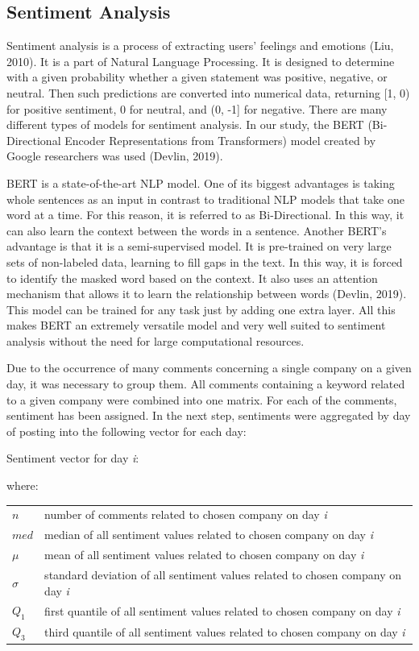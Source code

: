 \documentclass[review]{elsarticle} %
\makeatletter
\newenvironment{conditions}
{\par\vspace{\abovedisplayskip}\noindent\begin{tabular}{>{$}l<{$} @{${}={}$} l}}
       {\end{tabular}\par\vspace{\belowdisplayskip}}
\makeatother
\begin{document}
\subsection{Sentiment Analysis}
Sentiment analysis is a process of extracting users' feelings and emotions (Liu, 2010). It is a part of Natural Language Processing. It is designed to determine with a given probability whether a given statement was positive, negative, or neutral. Then such predictions are converted into numerical data, returning [1, 0) for positive sentiment, 0 for neutral, and (0, -1] for negative. There are many different types of models for sentiment analysis. In our study, the BERT (Bi-Directional Encoder Representations from Transformers) model created by Google researchers was used (Devlin, 2019). 

BERT is a state-of-the-art NLP model. One of its biggest advantages is taking whole sentences as an input in contrast to traditional NLP models that take one word at a time. For this reason, it is referred to as Bi-Directional. In this way, it can also learn the context between the words in a sentence. Another BERT's advantage is that it is a semi-supervised model. It is pre-trained on very large sets of non-labeled data, learning to fill gaps in the text. In this way, it is forced to identify the masked word based on the context. It also uses an attention mechanism that allows it to learn the relationship between words (Devlin, 2019). This model can be trained for any task just by adding one extra layer.  All this makes BERT an extremely versatile model and very well suited to sentiment analysis without the need for large computational resources. 


Due to the occurrence of many comments concerning a single company on a given day, it was necessary to group them. All comments containing a keyword related to a given company were combined into one matrix. For each of the comments, sentiment has been assigned. In the next step, sentiments were aggregated by day of posting into the following vector for each day: 
\begin{center}   Sentiment vector for day \emph{i}:\end{center}
\begin{equation} [n, \mu, \sigma, med, Q_1, Q_3] \end{equation}
where:
\begin{conditions}
 n     &  number of comments related to chosen company on day \emph{i}\\
 med     &  median of all sentiment values related to chosen company on day \emph{i} \\  
\mu    &  mean of all sentiment values related to chosen company on day \emph{i} \\    
\sigma    &  standard deviation of all sentiment values related to chosen company on day \emph{i} \\   
Q_1     &  first quantile of all sentiment values related to chosen company on day \emph{i} \\   
Q_3     &  third quantile of all sentiment values related to chosen company on day \emph{i} \\   
\end{conditions}
\end{document}
